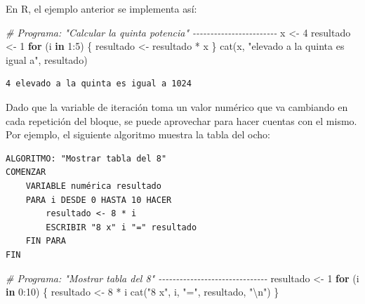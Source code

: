 \documentclass[
]{book}
\newenvironment{Shaded}{\begin{snugshade}}{\end{snugshade}}
\newcommand{\CommentTok}[1]{\textcolor[rgb]{0.56,0.35,0.01}{\textit{#1}}}
\newcommand{\ControlFlowTok}[1]{\textcolor[rgb]{0.13,0.29,0.53}{\textbf{#1}}}
\newcommand{\DecValTok}[1]{\textcolor[rgb]{0.00,0.00,0.81}{#1}}
\newcommand{\FunctionTok}[1]{\textcolor[rgb]{0.00,0.00,0.00}{#1}}
\newcommand{\NormalTok}[1]{#1}
\newcommand{\OtherTok}[1]{\textcolor[rgb]{0.56,0.35,0.01}{#1}}
\newcommand{\SpecialCharTok}[1]{\textcolor[rgb]{0.00,0.00,0.00}{#1}}
\newcommand{\StringTok}[1]{\textcolor[rgb]{0.31,0.60,0.02}{#1}}
\begin{document}
En R, el ejemplo anterior se implementa así:

\begin{Shaded}
\begin{Highlighting}[]
\CommentTok{\# Programa: "Calcular la quinta potencia" {-}{-}{-}{-}{-}{-}{-}{-}{-}{-}{-}{-}{-}{-}{-}{-}{-}{-}{-}{-}{-}{-}{-}{-}}
\NormalTok{x }\OtherTok{\textless{}{-}} \DecValTok{4}
\NormalTok{resultado }\OtherTok{\textless{}{-}} \DecValTok{1}
\ControlFlowTok{for}\NormalTok{ (i }\ControlFlowTok{in} \DecValTok{1}\SpecialCharTok{:}\DecValTok{5}\NormalTok{) \{}
\NormalTok{    resultado }\OtherTok{\textless{}{-}}\NormalTok{ resultado }\SpecialCharTok{*}\NormalTok{ x}
\NormalTok{\}}
\FunctionTok{cat}\NormalTok{(x, }\StringTok{"elevado a la quinta es igual a"}\NormalTok{, resultado)}
\end{Highlighting}
\end{Shaded}

\begin{verbatim}
4 elevado a la quinta es igual a 1024
\end{verbatim}

Dado que la variable de iteración toma un valor numérico que va cambiando en cada repetición del bloque, se puede aprovechar para hacer cuentas con el mismo. Por ejemplo, el siguiente algoritmo muestra la tabla del ocho:

\begin{verbatim}
ALGORITMO: "Mostrar tabla del 8"
COMENZAR
    VARIABLE numérica resultado
    PARA i DESDE 0 HASTA 10 HACER
        resultado <- 8 * i
        ESCRIBIR "8 x" i "=" resultado
    FIN PARA
FIN
\end{verbatim}

\begin{Shaded}
\begin{Highlighting}[]
\CommentTok{\# Programa: "Mostrar tabla del 8" {-}{-}{-}{-}{-}{-}{-}{-}{-}{-}{-}{-}{-}{-}{-}{-}{-}{-}{-}{-}{-}{-}{-}{-}{-}{-}{-}{-}{-}{-}{-}}
\NormalTok{resultado }\OtherTok{\textless{}{-}} \DecValTok{1}
\ControlFlowTok{for}\NormalTok{ (i }\ControlFlowTok{in} \DecValTok{0}\SpecialCharTok{:}\DecValTok{10}\NormalTok{) \{}
\NormalTok{    resultado }\OtherTok{\textless{}{-}} \DecValTok{8} \SpecialCharTok{*}\NormalTok{ i}
    \FunctionTok{cat}\NormalTok{(}\StringTok{"8 x"}\NormalTok{, i, }\StringTok{"="}\NormalTok{, resultado, }\StringTok{"}\SpecialCharTok{\textbackslash{}n}\StringTok{"}\NormalTok{)}
\NormalTok{\}}
\end{Highlighting}
\end{Shaded}
\end{document}
